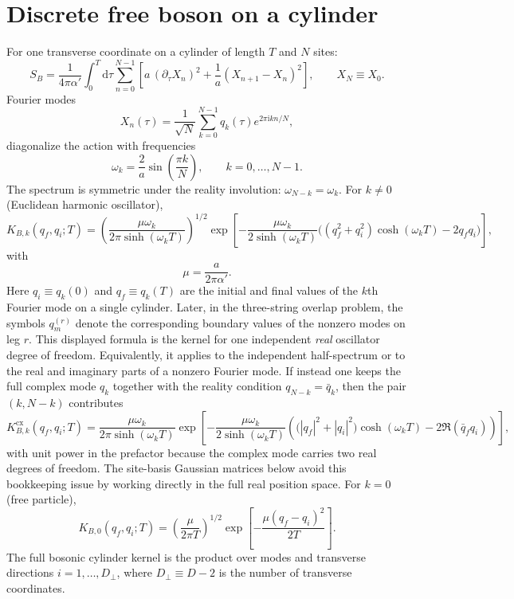 \documentclass[11pt]{article}
\numberwithin{equation}{section}
\newcommand{\al}{\alpha'}
\newcommand{\perpD}{D_\perp}
\newcommand{\ii}{\mathrm{i}}
\newcommand{\dd}{\mathrm{d}}
\begin{document}
\section{Discrete free boson on a cylinder}
For one transverse coordinate on a cylinder of length $T$ and $N$ sites:
\begin{equation}
\label{eq:s5-001}
S_B=\frac{1}{4\pi\al}\int_0^T\dd\tau\sum_{n=0}^{N-1}
\left[a\,(\partial_\tau X_n)^2+\frac{1}{a}(X_{n+1}-X_n)^2\right],\qquad X_N\equiv X_0.
\end{equation}
Fourier modes
\begin{equation}
\label{eq:s5-002}
X_n(\tau)=\frac{1}{\sqrt{N}}\sum_{k=0}^{N-1}q_k(\tau)e^{2\pi \ii kn/N},
\end{equation}
diagonalize the action with frequencies
\begin{equation}
\label{eq:s5-003}
\omega_k=\frac{2}{a}\sin\left(\frac{\pi k}{N}\right),\qquad k=0,\dots,N-1.
\end{equation}
The spectrum is symmetric under the reality involution: $\omega_{N-k}=\omega_k$.
For $k\neq 0$ (Euclidean harmonic oscillator),
\begin{equation}
\label{eq:s5-004}
K_{B,k}(q_f,q_i;T)=
\left(\frac{\mu\omega_k}{2\pi\sinh(\omega_k T)}\right)^{1/2}
\exp\!\left[
-\frac{\mu\omega_k}{2\sinh(\omega_k T)}
\big((q_f^2+q_i^2)\cosh(\omega_k T)-2q_fq_i\big)
\right],
\end{equation}
with
\begin{equation}
\label{eq:s5-005}
\mu=\frac{a}{2\pi\al}.
\end{equation}
Here $q_i\equiv q_k(0)$ and $q_f\equiv q_k(T)$ are the initial and final values of the $k$th Fourier mode on a single cylinder. Later, in the three-string overlap problem, the symbols $q_m^{(r)}$ denote the corresponding boundary values of the nonzero modes on leg $r$.
This displayed formula is the kernel for one independent \emph{real} oscillator degree of freedom. Equivalently, it applies to the independent half-spectrum or to the real and imaginary parts of a nonzero Fourier mode. If instead one keeps the full complex mode $q_k$ together with the reality condition $q_{N-k}=\bar q_k$, then the pair $(k,N-k)$ contributes
\begin{equation}
\label{eq:s5-006}
K_{B,k}^{\mathrm{cx}}(q_f,q_i;T)=
\frac{\mu\omega_k}{2\pi\sinh(\omega_k T)}
\exp\!\left[
-\frac{\mu\omega_k}{2\sinh(\omega_k T)}
\left(
\bigl(|q_f|^2+|q_i|^2\bigr)\cosh(\omega_k T)
-2\Re(\bar q_f q_i)
\right)
\right],
\end{equation}
with unit power in the prefactor because the complex mode carries two real degrees of freedom. The site-basis Gaussian matrices below avoid this bookkeeping issue by working directly in the full real position space.
For $k=0$ (free particle),
\begin{equation}
\label{eq:s5-007}
K_{B,0}(q_f,q_i;T)=
\left(\frac{\mu}{2\pi T}\right)^{1/2}
\exp\!\left[-\frac{\mu(q_f-q_i)^2}{2T}\right].
\end{equation}
The full bosonic cylinder kernel is the product over modes and transverse directions $i=1,\dots,\perpD$, where $\perpD \equiv D-2$ is the number of transverse coordinates.
\end{document}
